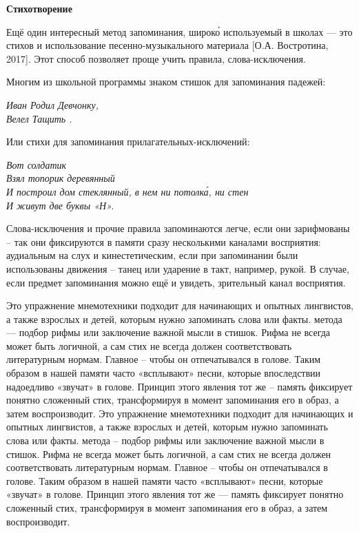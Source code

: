 \textbf{Стихотворение}

Ещё один интересный метод запоминания, широк\'{о} используемый в школах --- это  стихов и использование песенно-музыкального материала [О.А. Востротина, 2017]. Этот способ позволяет проще учить правила, слова-исключения.

Многим из школьной программы знаком стишок для запоминания падежей:

\begin{center}\it
    Иван Родил Девчонку,\\
    Велел Тащить .
\end{center}

Или стихи для запоминания прилагательных-исключений:

\begin{center}
    \it Вот солдатик \\
    Взял топорик деревянный\\
    И построил дом стеклянный, в нем ни потолк\'{а}, ни стен\\
    И живут две буквы «Н».
\end{center}

Слова-исключения и прочие правила запоминаются легче, если они зарифмованы – так они фиксируются в памяти сразу несколькими каналами восприятия: аудиальным на слух и кинестетическим, если при запоминании были использованы движения – танец или ударение в такт, например, рукой. В случае, если предмет запоминания можно ещё и увидеть,  зрительный канал восприятия.

Это упражнение мнемотехники подходит для начинающих и опытных лингвистов, а также взрослых и детей, которым нужно запоминать слова или факты.  метода --- подбор рифмы или заключение важной мысли в стишок. Рифма не всегда может быть логичной, а сам стих не всегда должен соответствовать литературным нормам. Главное – чтобы он отпечатывался в голове. Таким образом в нашей памяти часто «всплывают» песни, которые впоследствии надоедливо «звучат» в голове. Принцип этого явления тот же – память фиксирует понятно сложенный стих, трансформируя в момент запоминания его в образ, а затем воспроизводит.
Это упражнение мнемотехники подходит для начинающих и опытных лингвистов, а также взрослых и детей, которым нужно запоминать слова или факты.  метода – подбор рифмы или заключение важной мысли в стишок. Рифма не всегда может быть логичной, а сам стих не всегда должен соответствовать литературным нормам. Главное – чтобы он отпечатывался в голове. Таким образом в нашей памяти часто «всплывают» песни, которые   «звучат» в голове. Принцип этого явления тот же --- память фиксирует понятно сложенный стих, трансформируя в момент запоминания его в образ, а затем воспроизводит.

